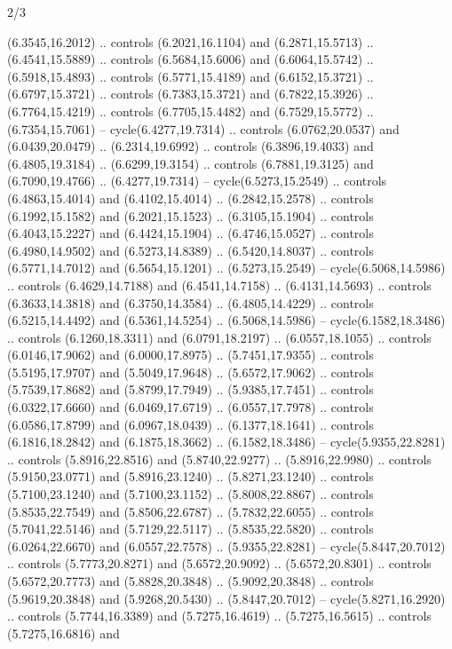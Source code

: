 \begin{flagdescription}{2/3}
\begin{scope}[yshift=\flagwidth,scale=\flagwidth/1241.93737]
\begin{scope}[y=-1mm, x=1mm,draw=gold,fill=blue,line join=miter,miter limit=4,line width=1.8\lw]
{  (6.3545,16.2012) .. controls (6.2021,16.1104) and (6.2871,15.5713) ..
  (6.4541,15.5889) .. controls (6.5684,15.6006) and (6.6064,15.5742) ..
  (6.5918,15.4893) .. controls (6.5771,15.4189) and (6.6152,15.3721) ..
  (6.6797,15.3721) .. controls (6.7383,15.3721) and (6.7822,15.3926) ..
  (6.7764,15.4219) .. controls (6.7705,15.4482) and (6.7529,15.5772) ..
  (6.7354,15.7061) -- cycle(6.4277,19.7314) .. controls (6.0762,20.0537) and
  (6.0439,20.0479) .. (6.2314,19.6992) .. controls (6.3896,19.4033) and
  (6.4805,19.3184) .. (6.6299,19.3154) .. controls (6.7881,19.3125) and
  (6.7090,19.4766) .. (6.4277,19.7314) -- cycle(6.5273,15.2549) .. controls
  (6.4863,15.4014) and (6.4102,15.4014) .. (6.2842,15.2578) .. controls
  (6.1992,15.1582) and (6.2021,15.1523) .. (6.3105,15.1904) .. controls
  (6.4043,15.2227) and (6.4424,15.1904) .. (6.4746,15.0527) .. controls
  (6.4980,14.9502) and (6.5273,14.8389) .. (6.5420,14.8037) .. controls
  (6.5771,14.7012) and (6.5654,15.1201) .. (6.5273,15.2549) --
  cycle(6.5068,14.5986) .. controls (6.4629,14.7188) and (6.4541,14.7158) ..
  (6.4131,14.5693) .. controls (6.3633,14.3818) and (6.3750,14.3584) ..
  (6.4805,14.4229) .. controls (6.5215,14.4492) and (6.5361,14.5254) ..
  (6.5068,14.5986) -- cycle(6.1582,18.3486) .. controls (6.1260,18.3311) and
  (6.0791,18.2197) .. (6.0557,18.1055) .. controls (6.0146,17.9062) and
  (6.0000,17.8975) .. (5.7451,17.9355) .. controls (5.5195,17.9707) and
  (5.5049,17.9648) .. (5.6572,17.9062) .. controls (5.7539,17.8682) and
  (5.8799,17.7949) .. (5.9385,17.7451) .. controls (6.0322,17.6660) and
  (6.0469,17.6719) .. (6.0557,17.7978) .. controls (6.0586,17.8799) and
  (6.0967,18.0439) .. (6.1377,18.1641) .. controls (6.1816,18.2842) and
  (6.1875,18.3662) .. (6.1582,18.3486) -- cycle(5.9355,22.8281) .. controls
  (5.8916,22.8516) and (5.8740,22.9277) .. (5.8916,22.9980) .. controls
  (5.9150,23.0771) and (5.8916,23.1240) .. (5.8271,23.1240) .. controls
  (5.7100,23.1240) and (5.7100,23.1152) .. (5.8008,22.8867) .. controls
  (5.8535,22.7549) and (5.8506,22.6787) .. (5.7832,22.6055) .. controls
  (5.7041,22.5146) and (5.7129,22.5117) .. (5.8535,22.5820) .. controls
  (6.0264,22.6670) and (6.0557,22.7578) .. (5.9355,22.8281) --
  cycle(5.8447,20.7012) .. controls (5.7773,20.8271) and (5.6572,20.9092) ..
  (5.6572,20.8301) .. controls (5.6572,20.7773) and (5.8828,20.3848) ..
  (5.9092,20.3848) .. controls (5.9619,20.3848) and (5.9268,20.5430) ..
  (5.8447,20.7012) -- cycle(5.8271,16.2920) .. controls (5.7744,16.3389) and
  (5.7275,16.4619) .. (5.7275,16.5615) .. controls (5.7275,16.6816) and
}
\end{scope}
\end{scope}
\end{flagdescription}
